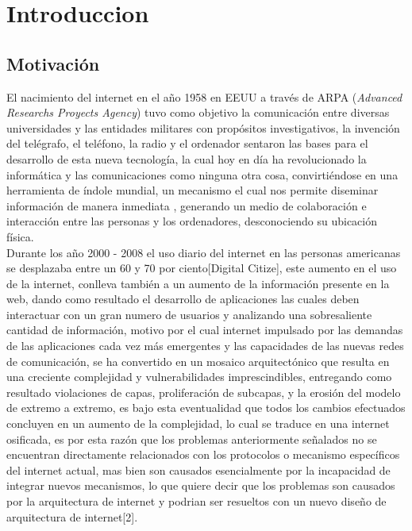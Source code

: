 \chapter*{Introduccion}
\section{Motivación}

El nacimiento del internet en el año 1958 en EEUU a través de ARPA (\textit{Advanced Researchs Proyects Agency}) tuvo como objetivo la comunicación entre diversas universidades y las entidades militares con propósitos investigativos, la invención del telégrafo, el teléfono, la radio y el ordenador sentaron las bases para el desarrollo de esta nueva tecnología, la cual hoy en día ha revolucionado la informática y las comunicaciones como ninguna otra cosa, convirtiéndose en una herramienta de índole mundial, un mecanismo el cual nos permite diseminar información de manera inmediata , generando un medio de colaboración e interacción entre las personas y los ordenadores, desconociendo su ubicación física.\\

Durante los año 2000 - 2008 el uso diario del internet en las personas americanas se desplazaba entre un 60 y 70 por ciento[Digital Citize], este aumento en el uso de la internet, conlleva también a un aumento de la información presente en la web, dando como resultado el desarrollo de aplicaciones las cuales deben interactuar con un gran numero de usuarios y analizando una sobresaliente cantidad de información, motivo por el cual internet impulsado por las demandas de las aplicaciones cada vez más emergentes y las capacidades de las nuevas redes de comunicación, se ha convertido en un mosaico arquitectónico que resulta en una creciente complejidad y vulnerabilidades imprescindibles, entregando como resultado violaciones de capas, proliferación de subcapas, y la erosión del modelo de extremo a extremo, es bajo esta eventualidad que todos los cambios efectuados concluyen en un aumento de la complejidad, lo cual se traduce en una internet osificada, es por esta razón que los problemas anteriormente señalados no se encuentran directamente relacionados con los protocolos o mecanismo específicos del internet actual, mas bien son causados esencialmente por la incapacidad de integrar nuevos mecanismos, lo que quiere decir que los problemas son causados por la arquitectura de internet y podrian ser resueltos con un nuevo diseño de arquitectura de internet[2].\\

